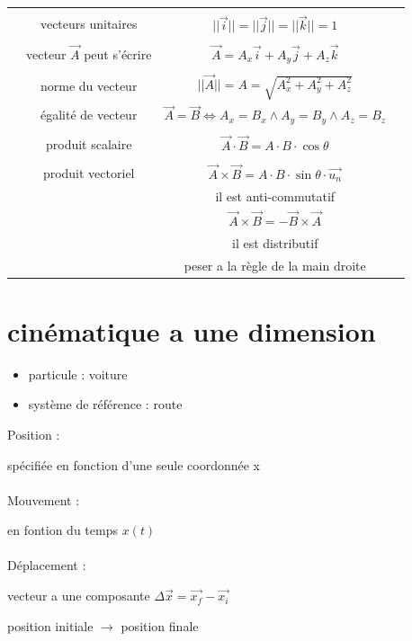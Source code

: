 \documentclass[]{article}
\begin{document}
\begin{tabular}{|c|c|c|c|}
&&&\\
& vecteurs unitaires & $||\overrightarrow{i}|| = ||\overrightarrow{j}||=||\overrightarrow{k}||=1$&\\
&&&\\
& vecteur $\overrightarrow{A}$ peut s'écrire & $\overrightarrow{A}=A_{x}\overrightarrow{i} + A_{y}\overrightarrow{j} + A_{z}\overrightarrow{k}$&\\
&&&\\
&norme du vecteur&$||\overrightarrow{A}|| = A = \sqrt{A^{2}_{x}+A^{2}_{y}+A^{2}_{z}}$&\\
&égalité de vecteur & $\overrightarrow{A}=\overrightarrow{B}\Leftrightarrow A_x=B_x \wedge A_y=B_y \wedge A_z=B_z$&\\
&&&\\
&produit scalaire& $\overrightarrow{A}\cdot \overrightarrow{B} = A\cdot B\cdot \cos{\theta}$&\\
&&&\\
&produit vectoriel&$\overrightarrow{A}\times \overrightarrow{B}=A \cdot B \cdot \sin{\theta} \cdot \overrightarrow{u_n}$&\\
&& il est anti-commutatif&\\
&&$\overrightarrow{A}\times \overrightarrow{B}=-\overrightarrow{B}\times \overrightarrow{A}$&\\
&& il est distributif &\\
&&peser a la règle de la main droite&\\
\hline
\end{tabular}
\newpage
\part{cinématique a une dimension}
\begin{itemize}
 \item particule : voiture
 \item système de référence : route
\end{itemize}
Position :

spécifiée en fonction d'une seule coordonnée x\\\\
Mouvement : 

en fontion du temps $x(t)$\\\\
Déplacement :

vecteur a une composante $\Delta \overrightarrow{x} = \overrightarrow{x_f} - \overrightarrow{x_i}$

position initiale $\rightarrow$ position finale
\end{document}
